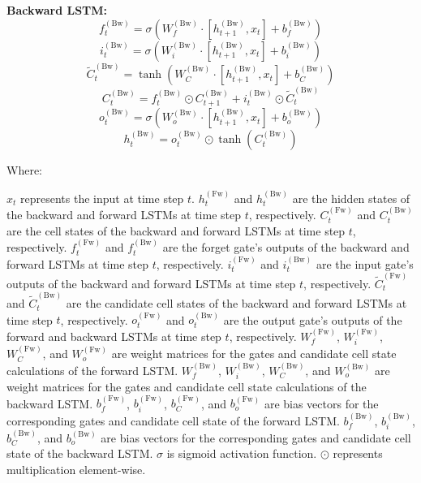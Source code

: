 \documentclass[sn-mathphys,Numbered]{sn-jnl}
\theoremstyle{thmstyleone}
\theoremstyle{thmstyletwo}
\theoremstyle{thmstylethree}
\begin{document}
\textbf{Backward LSTM:}
\begin{equation}
f_t^{(\text{Bw})} = \sigma(W_{f}^{(\text{Bw})} \cdot [h_{t+1}^{(\text{Bw})}, x_t] + b_{f}^{(\text{Bw})})
\end{equation}
\begin{equation}
i_t^{(\text{Bw})} = \sigma(W_{i}^{(\text{Bw})} \cdot [h_{t+1}^{(\text{Bw})}, x_t] + b_{i}^{(\text{Bw})})
\end{equation}
\begin{equation}
\tilde{C}_t^{(\text{Bw})} = \tanh(W_{C}^{(\text{Bw})} \cdot [h_{t+1}^{(\text{Bw})}, x_t] + b_{C}^{(\text{Bw})})
\end{equation}
\begin{equation}
C_t^{(\text{Bw})} = f_t^{(\text{Bw})} \odot C_{t+1}^{(\text{Bw})} + i_t^{(\text{Bw})} \odot \tilde{C}_t^{(\text{Bw})}
\end{equation}
\begin{equation}
o_t^{(\text{Bw})} = \sigma(W_{o}^{(\text{Bw})} \cdot [h_{t+1}^{(\text{Bw})}, x_t] + b_{o}^{(\text{Bw})})
\end{equation}
\begin{equation}
h_t^{(\text{Bw})} = o_t^{(\text{Bw})} \odot \tanh(C_t^{(\text{Bw})})
\end{equation}

Where:

\(x_t\) represents the input at time step \(t\).
 \(h_t^{(\text{Fw})}\) and \(h_t^{(\text{Bw})}\) are the hidden states of the backward and forward LSTMs at time step \(t\), respectively.
 \(C_t^{(\text{Fw})}\) and \(C_t^{(\text{Bw})}\) are the cell states of the backward and forward LSTMs at time step \(t\), respectively.
 \(f_t^{(\text{Fw})}\) and \(f_t^{(\text{Bw})}\) are the forget gate's outputs of the backward and forward LSTMs at time step \(t\), respectively.
 \(i_t^{(\text{Fw})}\) and \(i_t^{(\text{Bw})}\) are the input gate's outputs of the backward and forward LSTMs at time step \(t\), respectively.
 \(\tilde{C}_t^{(\text{Fw})}\) and \(\tilde{C}_t^{(\text{Bw})}\) are the candidate cell states of the backward and forward LSTMs at time step \(t\), respectively.
 \(o_t^{(\text{Fw})}\) and \(o_t^{(\text{Bw})}\) are the output gate's outputs of the forward and backward LSTMs at time step \(t\), respectively.
 \(W_{f}^{(\text{Fw})}\), \(W_{i}^{(\text{Fw})}\), \(W_{C}^{(\text{Fw})}\), and \(W_{o}^{(\text{Fw})}\) are weight matrices for the gates and candidate cell state calculations of the forward LSTM.
 \(W_{f}^{(\text{Bw})}\), \(W_{i}^{(\text{Bw})}\), \(W_{C}^{(\text{Bw})}\), and \(W_{o}^{(\text{Bw})}\) are weight matrices for the gates and candidate cell state calculations of the backward LSTM.
 \(b_{f}^{(\text{Fw})}\), \(b_{i}^{(\text{Fw})}\), \(b_{C}^{(\text{Fw})}\), and \(b_{o}^{(\text{Fw})}\) are bias vectors for the corresponding gates and candidate cell state of the forward LSTM.
 \(b_{f}^{(\text{Bw})}\), \(b_{i}^{(\text{Bw})}\), \(b_{C}^{(\text{Bw})}\), and \(b_{o}^{(\text{Bw})}\) are bias vectors for the corresponding gates and candidate cell state of the backward LSTM.
 \(\sigma\) is sigmoid activation function.
 \(\odot\) represents  multiplication element-wise.
\end{document}

